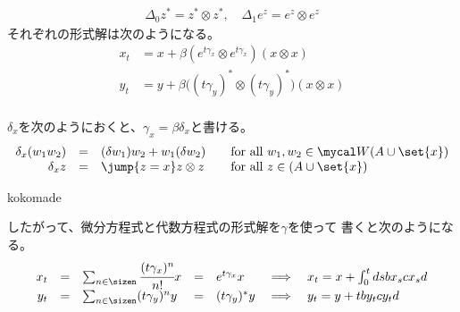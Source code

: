{\begin{note}[テイラー展開]
\begin{equation*}
\begin{split}
			\Delta_0z^* = z^*\otimes z^*,\quad \Delta_1e^z = e^z\otimes e^z
		\end{split}\end{equation*}
		それぞれの形式解は次のようになる。
		\begin{equation*}\begin{split}
			x_t &= x + \beta(e^{t\gamma_x}\otimes e^{t\gamma_x})(x\otimes x) \\
			y_t &= y + \beta\bigl((t\gamma_y)^*\otimes(t\gamma_y)^*\bigr)(x\otimes x) \\
		\end{split}\end{equation*}

		$\delta_x$を次のようにおくと、$\gamma_x=\beta\delta_x$と書ける。
		\begin{equation*}\begin{array}{rcll}
			\delta_x(w_1w_2) &=& (\delta w_1)w_2 + w_1(\delta w_2)
				& \quad\text{for all } w_1,w_2\in\W(A\cup\set{x}) \\
			\delta_xz &=& \jump{z = x} z\otimes z
				& \quad\text{for all } z\in(A\cup\set{x}) \\
		\end{array}\end{equation*}

		kokomade

		したがって、微分方程式と代数方程式の形式解を$\gamma$を使って
		書くと次のようになる。
		\begin{equation*}\begin{array}{rclclcl}
			x_t &=& \sum_{n\in\sizen}\cfrac{(t\gamma_x)^n}{n!}x
			&=& e^{t\gamma_x}x &\implies& x_t = x + \int_0^tds bx_scx_sd \\
			y_t &=& \sum_{n\in\sizen}(t\gamma_y)^ny
			&=& (t\gamma_y)^*y &\implies& y_t = y + tby_tcy_td \\
		\end{array}\end{equation*}
	\end{note} %

	\begin{todo}[ここまで]\label{todo:ここまで} %
	\end{todo} %

}
